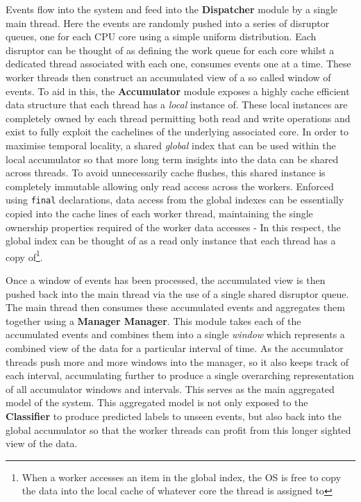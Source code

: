 \documentclass[a4paper,11pt]{scrreprt}
\begin{document}
Events flow into the system and feed into the \textbf{Dispatcher} module by a single main thread. Here the events are randomly pushed into a series of disruptor queues, one for each CPU core using a simple uniform distribution. Each disruptor can be thought of as defining the work queue for each core whilst a dedicated thread associated with each one, consumes events one at a time. These worker threads then construct an accumulated view of a so called window of events. To aid in this, the \textbf{Accumulator} module exposes a highly cache efficient data structure that each thread has a \textit{local} instance of. These local instances are completely owned by each thread permitting both read and write operations and exist to fully exploit the cachelines of the underlying associated core. In order to maximise temporal locality, a shared \textit{global} index that can be used within the local accumulator so that more long term insights into the data can be shared across threads. To avoid unnecessarily cache flushes, this shared instance is completely immutable allowing only read access across the workers. Enforced using \texttt{final} declarations, data access from the global indexes can be essentially copied into the cache lines of each worker thread, maintaining the single ownership properties required of the worker data accesses - In this respect, the global index can be thought of as a read only instance that each thread has a copy of\footnote{When a worker accesses an item in the global index, the OS is free to copy the data into the local cache of whatever core the thread is assigned to}.

Once a window of events has been processed, the accumulated view is then pushed back into the main thread via the use of a single shared disruptor queue. The main thread then consumes these accumulated events and aggregates them together using a \textbf{Manager Manager}. This module takes each of the accumulated events and combines them into a single \textit{window} which represents a combined view of the data for a particular interval of time. As the accumulator threads push more and more windows into the manager, so it also keeps track of each interval, accumulating further to produce a single overarching representation of all accumulator windows and intervals. This serves as the main aggregated model of the system. This aggregated model is not only exposed to the \textbf{Classifier} to produce predicted labels to unseen events, but also back into the global accumulator so that the worker threads can profit from this longer sighted view of the data.
\end{document}
